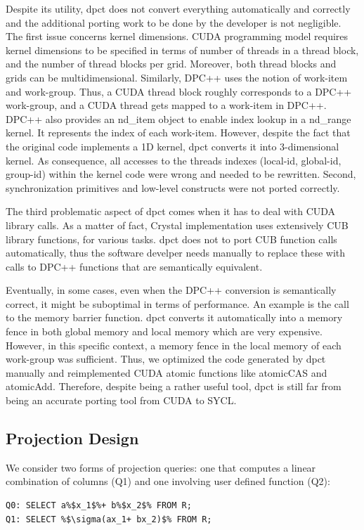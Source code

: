 \documentclass[sigconf, nonacm]{acmart}
\begin{document}
Despite its utility, dpct does not convert everything automatically and correctly and the additional porting work to be done by the developer is not negligible. The first issue concerns kernel dimensions. CUDA programming model requires kernel dimensions to be specified in terms of number of threads in a thread block, and the number of thread blocks per grid. Moreover, both thread blocks and grids can be multidimensional. Similarly, DPC++ uses the notion of work-item and work-group. Thus, a CUDA thread block roughly corresponds to a DPC++ work-group, and a CUDA thread gets mapped to a
work-item in DPC++. DPC++ also provides an nd\_item object to
enable index lookup in a nd\_range kernel. It represents the index of each work-item. 
However, despite the fact that the original code implements a 1D kernel, dpct converts it into 3-dimensional kernel. As consequence, all accesses to the threads indexes (local-id, global-id, group-id) within the kernel code were
wrong and needed to be rewritten. Second, synchronization primitives and low-level constructs were not ported correctly. 

The third problematic aspect of dpct comes when it has to deal with CUDA library calls. As a matter of fact, Crystal implementation uses extensively CUB library functions, for various tasks. dpct does not to port CUB function calls automatically, thus the software develper needs manually to replace these with calls to DPC++ functions that are semantically equivalent.

Eventually, in some cases, even when the DPC++ conversion is semantically correct, it might be suboptimal in terms of performance. An example is the call to the memory barrier function. dpct converts it automatically into a memory fence in both global memory and local memory which are very expensive. However, in this specific context, a memory fence in the local memory of each work-group was sufficient. 
Thus, we optimized the code generated by dpct manually and reimplemented CUDA atomic functions like atomicCAS and atomicAdd. Therefore, despite being a rather useful tool, dpct is still far from being an accurate porting tool from CUDA to SYCL. 
\subsection{Projection Design}
We consider two forms of projection queries: one that
computes a linear combination of columns (Q1) and one
involving user defined function (Q2):

\begin{lstlisting}[escapechar=\%]
Q0: SELECT a%$x_1$%+ b%$x_2$% FROM R;
Q1: SELECT %$\sigma(ax_1+ bx_2)$% FROM R; 
\end{lstlisting}
\end{document}
